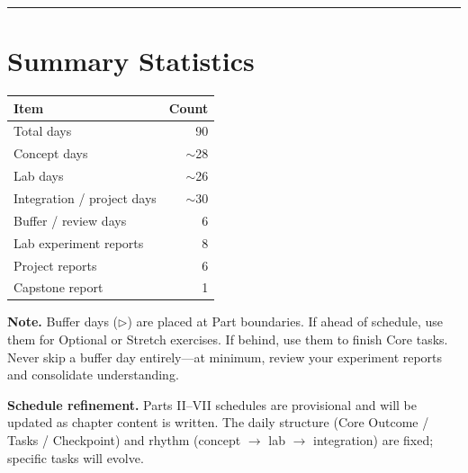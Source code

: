 \bigskip
\hrule
\bigskip

\section*{Summary Statistics}

\begin{center}
\begin{tabular}{lr}
\toprule
\textbf{Item} & \textbf{Count} \\
\midrule
Total days & 90 \\
Concept days & $\sim$28 \\
Lab days & $\sim$26 \\
Integration / project days & $\sim$30 \\
Buffer / review days & 6 \\
Lab experiment reports & 8 \\
Project reports & 6 \\
Capstone report & 1 \\
\bottomrule
\end{tabular}
\end{center}

\noindent \textbf{Note.} Buffer days ($\triangleright$) are placed at Part boundaries. If ahead of schedule, use them for Optional or Stretch exercises. If behind, use them to finish Core tasks. Never skip a buffer day entirely---at minimum, review your experiment reports and consolidate understanding.

\medskip

\noindent \textbf{Schedule refinement.} Parts II--VII schedules are provisional and will be updated as chapter content is written. The daily structure (Core Outcome / Tasks / Checkpoint) and rhythm (concept $\rightarrow$ lab $\rightarrow$ integration) are fixed; specific tasks will evolve.
